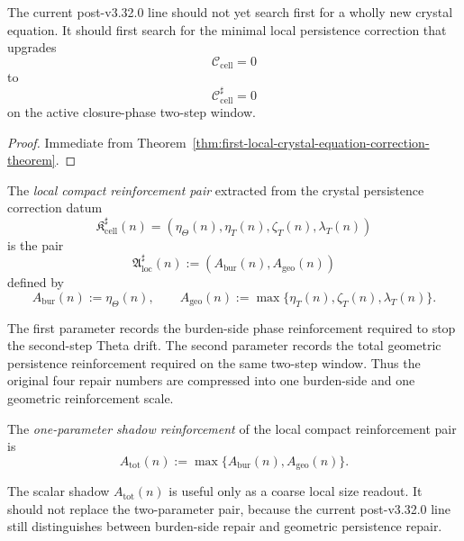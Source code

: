 \begin{corollary}
\label{cor:current-crystal-equation-working-rule}
The current post-v3.32.0 line should not yet search first for a wholly new crystal equation. It should first search for the minimal local persistence correction that upgrades
\[
  \mathcal C_{\mathrm{cell}}=0
\]
to
\[
  \mathcal C_{\mathrm{cell}}^{\sharp}=0
\]
on the active closure-phase two-step window.
\end{corollary}

\begin{proof}
Immediate from Theorem~\ref{thm:first-local-crystal-equation-correction-theorem}.
\end{proof}


\begin{definition}
\label{def:local-compact-reinforcement-pair}
The \emph{local compact reinforcement pair} extracted from the crystal persistence correction datum
\[
  \mathfrak K_{\mathrm{cell}}^{\sharp}(n)
  =
  (\eta_{\Theta}(n),\eta_T(n),\zeta_T(n),\lambda_T(n))
\]
is the pair
\[
  \mathfrak A_{\mathrm{loc}}^{\sharp}(n)
  :=
  (A_{\mathrm{bur}}(n),A_{\mathrm{geo}}(n))
\]
defined by
\[
  A_{\mathrm{bur}}(n):=\eta_{\Theta}(n),
  \qquad
  A_{\mathrm{geo}}(n):=\max\{\eta_T(n),\zeta_T(n),\lambda_T(n)\}.
\]
\end{definition}

\begin{remark}
\label{rem:meaning-of-the-compact-pair}
The first parameter records the burden-side phase reinforcement required to stop the second-step Theta drift.
The second parameter records the total geometric persistence reinforcement required on the same two-step window.
Thus the original four repair numbers are compressed into one burden-side and one geometric reinforcement scale.
\end{remark}

\begin{definition}
\label{def:one-parameter-shadow-reinforcement}
The \emph{one-parameter shadow reinforcement} of the local compact reinforcement pair is
\[
  A_{\mathrm{tot}}(n)
  :=
  \max\{A_{\mathrm{bur}}(n),A_{\mathrm{geo}}(n)\}.
\]
\end{definition}

\begin{remark}
\label{rem:why-the-one-parameter-shadow-is-secondary}
The scalar shadow $A_{\mathrm{tot}}(n)$ is useful only as a coarse local size readout.
It should not replace the two-parameter pair, because the current post-v3.32.0 line still distinguishes between burden-side repair and geometric persistence repair.
\end{remark}


